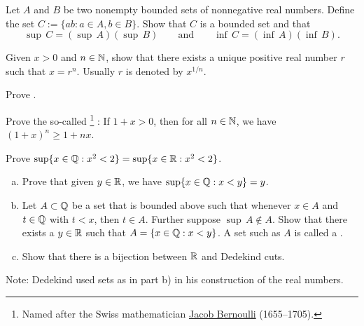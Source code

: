 \begin{exercise}
Let $A$ and $B$ be two nonempty bounded sets of nonnegative real numbers.
Define the set
$C := \{ ab : a \in A, b \in B \}$.
Show that $C$ is a bounded set and that
\begin{equation*}
\sup\,C = (\sup\,A )( \sup\,B) 
\qquad \text{and} \qquad
\inf\,C = (\inf\,A )( \inf\,B).
\end{equation*}
\end{exercise}

\begin{exercise}[Hard] \label{exercise:rootexistshard}
Given $x > 0$ and $n \in {\mathbb{N}}$, show that there exists a unique positive
real number $r$ such that $x = r^n$.  Usually $r$ is denoted by $x^{1/n}$.
\end{exercise}

\begin{exercise}[Easy]
Prove .
\end{exercise}

\begin{exercise} \label{exercise:bernoulliineq}
Prove the so-called \emph{}%
\footnote{%
Named after the Swiss mathematician
\href{https://en.wikipedia.org/wiki/Jacob_Bernoulli}{Jacob Bernoulli}
(1655--1705).}%
: If $1+x > 0$, then
for all $n \in {\mathbb{N}}$, we have $(1+x)^n \geq 1+nx$.
\end{exercise}

\begin{exercise} \label{exercise:sqrt2QorR}
Prove $\sup \{ x \in {\mathbb{Q}} : x^2 < 2 \} = \sup \{ x \in {\mathbb{R}} : x^2 < 2 \}$.
\end{exercise}

\begin{exercise} \label{exercise:Dedekind}
\leavevmode
\begin{enumerate}[a)]
\item
Prove that given $y \in {\mathbb{R}}$, we have $\sup \{ x \in {\mathbb{Q}} : x < y \} = y$.
\item
Let $A \subset {\mathbb{Q}}$ be a set that is bounded above such that whenever $x
\in A$ and $t \in {\mathbb{Q}}$ with $t < x$, then $t \in A$.  Further suppose 
$\sup\, A \not\in A$.  Show that there exists a $y \in {\mathbb{R}}$ such that
$A = \{ x \in {\mathbb{Q}} : x < y \}$.  A set such as $A$ is called a
\emph{}.
\item
Show that there is a bijection between ${\mathbb{R}}$ and Dedekind cuts.
\end{enumerate}
Note: Dedekind used sets as in part b) in his construction of the
real numbers.
\end{exercise}

